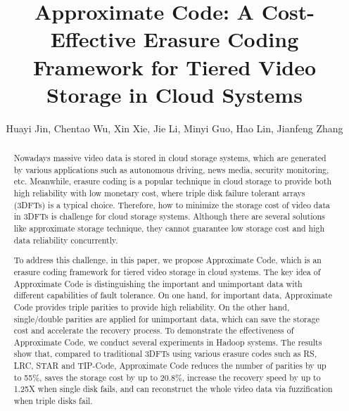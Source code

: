 \documentclass[sigconf]{acmart}
\begin{document}
\title{Approximate Code: A Cost-Effective Erasure Coding Framework for Tiered Video Storage in Cloud Systems}

\author{Huayi Jin, Chentao Wu, Xin Xie, Jie Li, Minyi Guo, Hao Lin, Jianfeng Zhang}

\begin{abstract}
Nowadays massive video data is stored in cloud storage systems, which are generated by various applications such as autonomous driving, news media, security monitoring, etc. Meanwhile, erasure coding is a popular technique in cloud storage to provide both high reliability with low monetary cost, where triple disk failure tolerant arrays (3DFTs) is a typical choice. Therefore, how to minimize the storage cost of video data in 3DFTs is challenge for cloud storage systems. Although there are several solutions like approximate storage technique, they cannot guarantee low storage cost and high data reliability concurrently.

To address this challenge, in this paper, we propose Approximate Code, which is an erasure coding framework for tiered video storage in cloud systems. The key idea of Approximate Code is distinguishing the important and unimportant data with different capabilities of fault tolerance. On one hand, for important data, Approximate Code provides triple parities to provide high reliability. On the other hand, single/double parities are applied for unimportant data, which can save the storage cost and accelerate the recovery process. To demonstrate the effectiveness of Approximate Code, we conduct several experiments in Hadoop systems. The results show that, compared to traditional 3DFTs using various erasure codes such as RS, LRC, STAR and TIP-Code, Approximate Code reduces the number of parities by up to 55\%, saves the storage cost by up to 20.8\%, increase the recovery speed by up to 1.25X when single disk fails, and can reconstruct the whole video data via fuzzification when triple disks fail.
\end{abstract}


\maketitle
\end{document}
